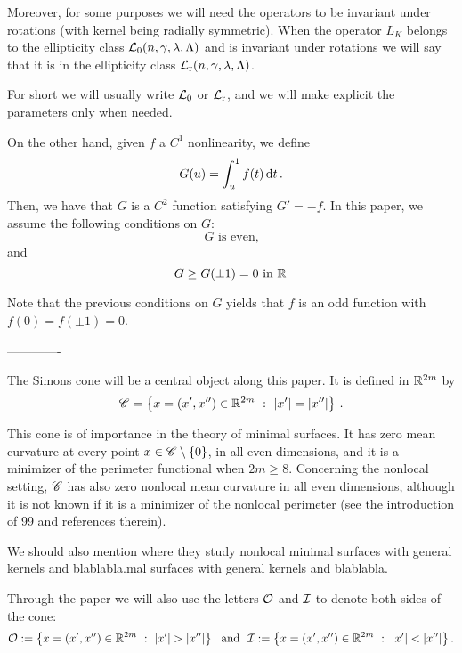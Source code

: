 Moreover, for some purposes we will need the operators to be invariant under rotations (with kernel being radially symmetric). When the operator $L_K$ belongs to the ellipticity class $\mathcal{L}_0(n,\gamma,\lambda, \Lambda)$ and is invariant under rotations we will say that it is in the ellipticity class $\mathcal{L}_{\mathrm{r}}(n,\gamma,\lambda, \Lambda)$.


For short we will usually write $\mathcal{L}_0$ or $\mathcal{L}_{\mathrm{r}}$, and we will make explicit the parameters only when needed.

On the other hand, given $f$ a $C^1$ nonlinearity, we define
$$
G(u)= \int_u^1 f(t) \,\mathrm{d} t\,.
$$
Then, we have that $G$ is a $C^2$ function satisfying $G' = -f$. In this paper, we assume the following conditions on $G$:
\begin{equation}
\label{Eq:HipothesisfOdd}
G \textrm{ is even,}
\end{equation}
and
\begin{equation}
\label{Eq:HipothesisGWells}
G\geq G(\pm 1 )=0 \textrm{ in } \mathbb{R}\,
\end{equation}


Note that the previous conditions on $G$ yields that $f$ is an odd function with $f(0)=f(\pm 1)=0$.


\bigskip
\bigskip
\bigskip
-------------
\bigskip
\bigskip
\bigskip

The Simons cone will be a central object along this paper. It is defined in $\mathbb{R}^{2m}$ by
\begin{equation}
\label{Eq:SimonsCone}
\mathscr{C} = \left \{ x = (x', x'') \in \mathbb{R}^{2m} \ : \ |x'| = |x''| \right \}\,.
\end{equation}

This cone is of importance in the theory of minimal surfaces. It has zero mean curvature at every point $x\in \mathscr{C} \setminus \{0\}$, in all even dimensions, and it is a minimizer of the perimeter functional when $2m\geq 8$. Concerning the nonlocal setting, $\mathscr{C}$ has also zero nonlocal mean curvature in all even dimensions, although it is not known if it is a minimizer of the nonlocal perimeter (see the introduction of 99 and references therein).

We should also mention \cite{DipierroSerraValdinoci} where they study nonlocal minimal surfaces with general kernels and blablabla.mal surfaces with general kernels and blablabla.

Through the paper we will also use the letters $\mathcal{O}$ and $\mathcal{I}$ to denote both sides of the cone:
\begin{equation}
\label{Eq:DefOandI}
\mathcal{O}:= \left \{ x = (x', x'') \in \mathbb{R}^{2m} \ : \ |x'| > |x''| \right \} \ \textrm{ and } \
\mathcal{I}:= \left \{ x = (x', x'') \in \mathbb{R}^{2m} \ : \ |x'| < |x''| \right \}.
\end{equation}



